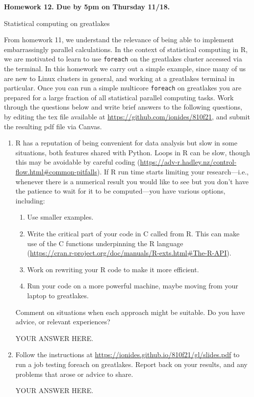 \documentclass[12pt]{article}
\begin{document}
\begin{center}\bf
Homework 12. Due by 5pm on Thursday 11/18.

Statistical computing on greatlakes

\end{center}

From homework 11, we understand the relevance of being able to implement embarrassingly parallel calculations. In the context of statistical computing in R, we are motivated to learn to use \texttt{foreach} on the greatlakes cluster accessed via the terminal. In this homework we carry out a simple example, since many of us are new to Linux clusters in general, and working at a greatlakes terminal in particular. Once you can run a simple multicore \texttt{foreach} on greatlakes you are prepared for a large fraction of all statistical parallel computing tasks. Work through the questions below and write brief answers to the following questions, by editing the tex file available at \url{https://github.com/ionides/810f21}, and submit the resulting pdf file via Canvas. 

\begin{enumerate}

\item R has a reputation of being convenient for data analysis but slow in some situations, both features shared with Python. Loops in R can be slow, though this may be avoidable by careful coding (\url{https://adv-r.hadley.nz/control-flow.html#common-pitfalls}). If R run time starts limiting your research---i.e., whenever there is a numerical result you would like to see but you don't have the patience to wait for it to be computed---you have various options, including:
  \begin{enumerate}
  \item Use smaller examples.
  \item Write the critical part of your code in C called from R. This can make use of the C functions underpinning the R language\\
(\url{https://cran.r-project.org/doc/manuals/R-exts.html#The-R-API}).
  \item Work on rewriting your R code to make it more efficient.
  \item Run your code on a more powerful machine, maybe moving from your laptop to greatlakes.
  \end{enumerate}
Comment on situations when each approach might be suitable. Do you have advice, or relevant experiences?
  
  YOUR ANSWER HERE.

\item Follow the instructions at \url{https://ionides.github.io/810f21/gl/slides.pdf} to run a job testing foreach on greatlakes. Report back on your results, and any problems that arose or advice to share.

YOUR ANSWER HERE.
  
\end{enumerate}
\end{document}
